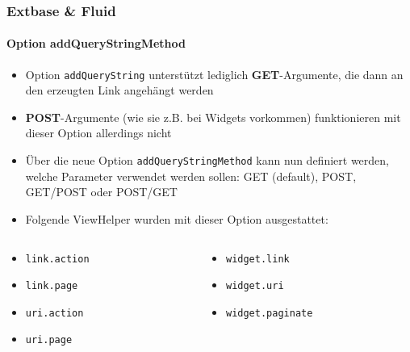 \begin{frame}[fragile]
	\frametitle{Extbase \& Fluid}
	\framesubtitle{Option addQueryStringMethod}

	\begin{itemize}
		\item Option \texttt{addQueryString} unterstützt lediglich \textbf{GET}-Argumente, die dann an den erzeugten Link angehängt werden
		\item \textbf{POST}-Argumente (wie sie z.B. bei Widgets vorkommen) funktionieren mit dieser Option allerdings nicht
		\item Über die neue Option \texttt{addQueryStringMethod} kann nun definiert werden, welche Parameter verwendet werden sollen:\newline
			GET (default), POST, GET/POST oder POST/GET
		\item Folgende ViewHelper wurden mit dieser Option ausgestattet:
	\end{itemize}

	\begin{columns}[T]

		\begin{column}{.5\textwidth}
			\begin{itemize}\vspace*{-0.4cm}\smaller
				\advance\leftskip+1cm
				\item \texttt{link.action}
				\item \texttt{link.page}
				\item \texttt{uri.action}
				\item \texttt{uri.page}
			\end{itemize}
		\end{column}

		\begin{column}{.5\textwidth}
			\begin{itemize}\vspace*{-0.4cm}\smaller
				\item \texttt{widget.link}
				\item \texttt{widget.uri}
				\item \texttt{widget.paginate}
			\end{itemize}
		\end{column}

	\end{columns}

\end{frame}



